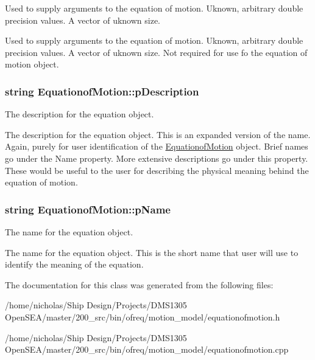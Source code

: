 Used to supply arguments to the equation of motion. Uknown, arbitrary double precision values. A vector of uknown size. 

Used to supply arguments to the equation of motion. Uknown, arbitrary double precision values. A vector of uknown size. Not required for use fo the equation of motion object. \hypertarget{class_equationof_motion_a042a6741c1b526dcb40348dd89a6c5d5}{
\subsubsection[{p\-Description}]{\setlength{\rightskip}{0pt plus 5cm}string Equationof\-Motion\-::p\-Description\hspace{0.3cm}{\ttfamily [protected]}}}\label{class_equationof_motion_a042a6741c1b526dcb40348dd89a6c5d5}


The description for the equation object. 

The description for the equation object. This is an expanded version of the name. Again, purely for user identification of the \hyperlink{class_equationof_motion}{Equationof\-Motion} object. Brief names go under the Name property. More extensive descriptions go under this property. These would be useful to the user for describing the physical meaning behind the equation of motion. \hypertarget{class_equationof_motion_ad4657581e962d18d09c02734c9568006}{
\subsubsection[{p\-Name}]{\setlength{\rightskip}{0pt plus 5cm}string Equationof\-Motion\-::p\-Name\hspace{0.3cm}{\ttfamily [protected]}}}\label{class_equationof_motion_ad4657581e962d18d09c02734c9568006}


The name for the equation object. 

The name for the equation object. This is the short name that user will use to identify the meaning of the equation. 

The documentation for this class was generated from the following files\-:\begin{DoxyCompactItemize}
\item 
/home/nicholas/\-Ship Design/\-Projects/\-D\-M\-S1305 Open\-S\-E\-A/master/200\-\_\-src/bin/ofreq/motion\-\_\-model/equationofmotion.\-h\item 
/home/nicholas/\-Ship Design/\-Projects/\-D\-M\-S1305 Open\-S\-E\-A/master/200\-\_\-src/bin/ofreq/motion\-\_\-model/equationofmotion.\-cpp\end{DoxyCompactItemize}
